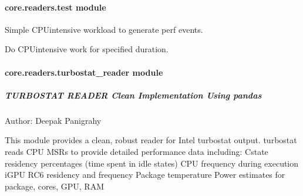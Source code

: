 \documentclass[letterpaper,10pt,english]{sphinxmanual}
\begin{document}
\sphinxstepscope


\paragraph{core.readers.test module}
\label{\detokenize{core.readers.test:module-core.readers.test}}\label{\detokenize{core.readers.test:core-readers-test-module}}\label{\detokenize{core.readers.test::doc}}
\sphinxAtStartPar
Simple CPU\sphinxhyphen{}intensive workload to generate perf events.

\begin{fulllineitems}
\label{\detokenize{core.readers.test:core.readers.test.busy_work}}
\pysigstartsignatures
\pysiglinewithargsret
{}
{}
{}
\pysigstopsignatures
\sphinxAtStartPar
Do CPU\sphinxhyphen{}intensive work for specified duration.

\end{fulllineitems}


\sphinxstepscope


\paragraph{core.readers.turbostat\_reader module}
\label{\detokenize{core.readers.turbostat_reader:module-core.readers.turbostat_reader}}\label{\detokenize{core.readers.turbostat_reader:core-readers-turbostat-reader-module}}\label{\detokenize{core.readers.turbostat_reader::doc}}

\subparagraph{TURBOSTAT READER \sphinxhyphen{} Clean Implementation Using pandas}
\label{\detokenize{core.readers.turbostat_reader:turbostat-reader-clean-implementation-using-pandas}}
\sphinxAtStartPar
Author: Deepak Panigrahy

\sphinxAtStartPar
This module provides a clean, robust reader for Intel turbostat output.
turbostat reads CPU MSRs to provide detailed performance data including:
\sphinxhyphen{} C\sphinxhyphen{}state residency percentages (time spent in idle states)
\sphinxhyphen{} CPU frequency during execution
\sphinxhyphen{} iGPU RC6 residency and frequency
\sphinxhyphen{} Package temperature
\sphinxhyphen{} Power estimates for package, cores, GPU, RAM
\end{document}
